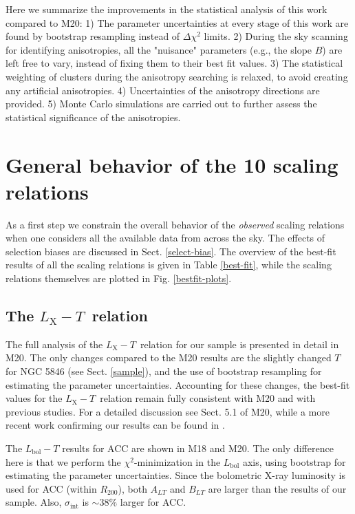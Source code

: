 \documentclass{aa}   %
\newcommand{\LT}{$L_{\text{X}}-T$}
\begin{document}
Here we summarize the improvements in the statistical analysis of this work compared to M20: 1) The parameter uncertainties at every stage of this work are found by bootstrap resampling instead of $\Delta \chi^2$ limits. 2) During the sky scanning for identifying anisotropies, all the "nuisance" parameters (e.g., the slope $B$) are left free to vary, instead of fixing them to their best fit values. 3) The statistical weighting of clusters during the anisotropy searching is relaxed, to avoid creating any artificial anisotropies. 4) Uncertainties of the anisotropy directions are provided. 5) Monte Carlo simulations are carried out to further assess the statistical significance of the anisotropies.

\section{General behavior of the 10 scaling relations}\label{mainresults} 

As a first step we constrain the overall behavior of the \emph{observed} scaling relations when one considers all the available data from across the sky. The effects of selection biases are discussed in Sect. \ref{select-bias}. The overview of the best-fit results of all the scaling relations is given in Table \ref{best-fit}, while the scaling relations themselves are plotted in Fig. \ref{bestfit-plots}.

\subsection{The \LT\ relation}

The full analysis of the \LT\ relation for our sample is presented in detail in M20. The only changes compared to the M20 results are the slightly changed $T$ for NGC 5846 (see Sect. \ref{sample}), and the use of bootstrap resampling for estimating the parameter uncertainties. Accounting for these changes, the best-fit values for the \LT\ relation remain fully consistent with M20 and with previous studies. For a detailed discussion see Sect. 5.1 of M20, while a more recent work confirming our results can be found in \citet{lorenzo20}. 

The $L_{\text{bol}}-T$ results for ACC are shown in M18 and M20. The only difference here is that we perform the $\chi^2$-minimization in the $L_{\text{bol}}$ axis, using bootstrap for estimating the parameter uncertainties. Since the bolometric X-ray luminosity is used for ACC (within $R_{200}$), both $A_{LT}$ and $B_{LT}$ are larger than the results of our sample. Also, $\sigma_{\text{int}}$ is $\sim 38\%$ larger for ACC.
\end{document}
